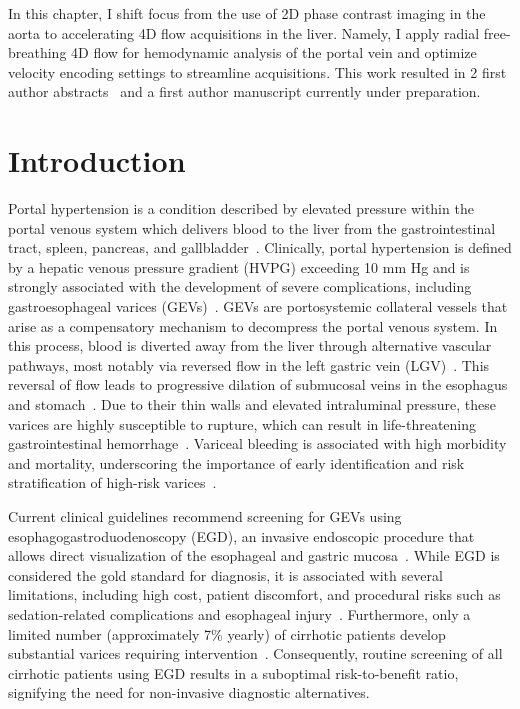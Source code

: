 In this chapter, I shift focus from the use of 2D phase contrast imaging in the aorta to accelerating 4D flow acquisitions in the liver. Namely, I apply radial free-breathing 4D flow for hemodynamic analysis of the portal vein and optimize velocity encoding settings to streamline acquisitions. This work resulted in 2 first author abstracts~\cite{narenDualVenc, narenHowLow} and a first author manuscript currently under preparation. 

\section{Introduction}\label{sec:gevenc_intro}
Portal hypertension is a condition described by elevated pressure within the portal venous system which delivers blood to the liver from the gastrointestinal tract, spleen, pancreas, and gallbladder~\cite{oechteringClinicalApplications4D2022,iwakiriPathophysiologyPortalHypertension2014}. Clinically, portal hypertension is defined by a hepatic venous pressure gradient (HVPG) exceeding 10 mm Hg and is strongly associated with the development of severe complications, including gastroesophageal varices (GEVs)~\cite{garcia-tsaoPortalHypertensiveBleeding2017,garcia-tsaoManagementVaricesVariceal2010}. GEVs are portosystemic collateral vessels that arise as a compensatory mechanism to decompress the portal venous system. In this process, blood is diverted away from the liver through alternative vascular pathways, most notably via reversed flow in the left gastric vein (LGV)~\cite{sanyalPortalHypertension, gabaGastroesophagealVaricealFilling2015}. This reversal of flow leads to progressive dilation of submucosal veins in the esophagus and stomach~\cite{sanyalPortalHypertension, gabaGastroesophagealVaricealFilling2015}. Due to their thin walls and elevated intraluminal pressure, these varices are highly susceptible to rupture, which can result in life-threatening gastrointestinal hemorrhage~\cite{carbonellImprovedSurvivalVariceal2004}. Variceal bleeding is associated with high morbidity and mortality, underscoring the importance of early identification and risk stratification of high-risk varices~\cite{garcia-tsaoPortalHypertensiveBleeding2017,carbonellImprovedSurvivalVariceal2004}.

Current clinical guidelines recommend screening for GEVs using esophagogastroduodenoscopy (EGD), an invasive endoscopic procedure that allows direct visualization of the esophageal and gastric mucosa~\cite{carbonellImprovedSurvivalVariceal2004}. While EGD is considered the gold standard for diagnosis, it is associated with several limitations, including high cost, patient discomfort, and procedural risks such as sedation-related complications and esophageal injury~\cite{jangGastrointestinalNongastrointestinalComplication2022}. Furthermore, only a limited number (approximately 7\% yearly) of cirrhotic patients develop substantial varices requiring intervention~\cite{garcia-tsaoManagementVaricesVariceal2010}. Consequently, routine screening of all cirrhotic patients using EGD results in a suboptimal risk-to-benefit ratio, signifying the need for non-invasive diagnostic alternatives.

